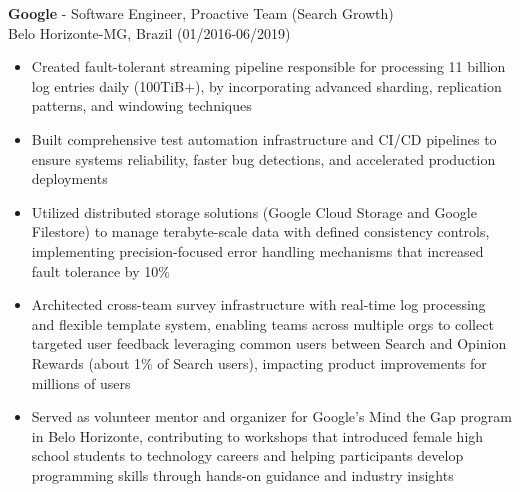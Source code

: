 
\normalsize{\textbf{Google} - \BackEndWriting Software Engineer, Proactive Team (Search Growth)}\\
\footnotesize{Belo Horizonte-MG, Brazil (01/2016-06/2019)}

\begin{itemize}
    \item \small{Created fault-tolerant streaming pipeline responsible for processing 11 billion log entries daily (100TiB+), by incorporating advanced sharding, replication patterns, and windowing techniques}

    \item \small{Built comprehensive test automation infrastructure and CI/CD pipelines to ensure systems reliability, faster bug detections, and accelerated production deployments}

    \item \small{Utilized distributed storage solutions (Google Cloud Storage and Google Filestore) to manage terabyte-scale data with defined consistency controls, implementing precision-focused error handling mechanisms that increased fault tolerance by 10\%}

    \clearpage

    \item \small{Architected cross-team survey infrastructure with real-time log processing and flexible template system, enabling teams across multiple orgs to collect targeted user feedback leveraging common users between Search and Opinion Rewards (about 1\% of Search users), impacting product improvements for millions of users}

    \item \small{Served as volunteer mentor and organizer for Google's Mind the Gap program in Belo Horizonte, contributing to workshops that introduced female high school students to technology careers and helping participants develop programming skills through hands-on guidance and industry insights}
\end{itemize}